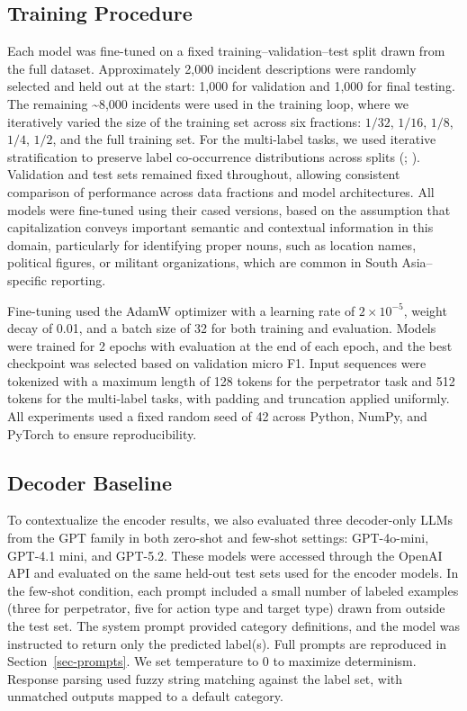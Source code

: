 \documentclass[
  11pt,
]{article}
\begin{document}
\subsection{Training Procedure}\label{training-procedure}

Each model was fine-tuned on a fixed training--validation--test split
drawn from the full dataset. Approximately 2,000 incident descriptions
were randomly selected and held out at the start: 1,000 for validation
and 1,000 for final testing. The remaining \textasciitilde8,000
incidents were used in the training loop, where we iteratively varied
the size of the training set across six fractions: \(1/32\), \(1/16\),
\(1/8\), \(1/4\), \(1/2\), and the full training set. For the
multi-label tasks, we used iterative stratification to preserve label
co-occurrence distributions across splits
(;
).
Validation and test sets remained fixed throughout, allowing consistent
comparison of performance across data fractions and model architectures.
All models were fine-tuned using their cased versions, based on the
assumption that capitalization conveys important semantic and contextual
information in this domain, particularly for identifying proper nouns,
such as location names, political figures, or militant organizations,
which are common in South Asia--specific reporting.

Fine-tuning used the AdamW optimizer with a learning rate of
\(2 \times 10^{-5}\), weight decay of 0.01, and a batch size of 32 for
both training and evaluation. Models were trained for 2 epochs with
evaluation at the end of each epoch, and the best checkpoint was
selected based on validation micro F1. Input sequences were tokenized
with a maximum length of 128 tokens for the perpetrator task and 512
tokens for the multi-label tasks, with padding and truncation applied
uniformly. All experiments used a fixed random seed of 42 across Python,
NumPy, and PyTorch to ensure reproducibility.

\subsection{Decoder Baseline}\label{decoder-baseline}

To contextualize the encoder results, we also evaluated three
decoder-only LLMs from the GPT family in both zero-shot and few-shot
settings: GPT-4o-mini, GPT-4.1 mini, and GPT-5.2. These models were
accessed through the OpenAI API and evaluated on the same held-out test
sets used for the encoder models. In the few-shot condition, each prompt
included a small number of labeled examples (three for perpetrator, five
for action type and target type) drawn from outside the test set. The
system prompt provided category definitions, and the model was
instructed to return only the predicted label(s). Full prompts are
reproduced in Section~\ref{sec-prompts}. We set temperature to 0 to
maximize determinism. Response parsing used fuzzy string matching
against the label set, with unmatched outputs mapped to a default
category.
\end{document}
